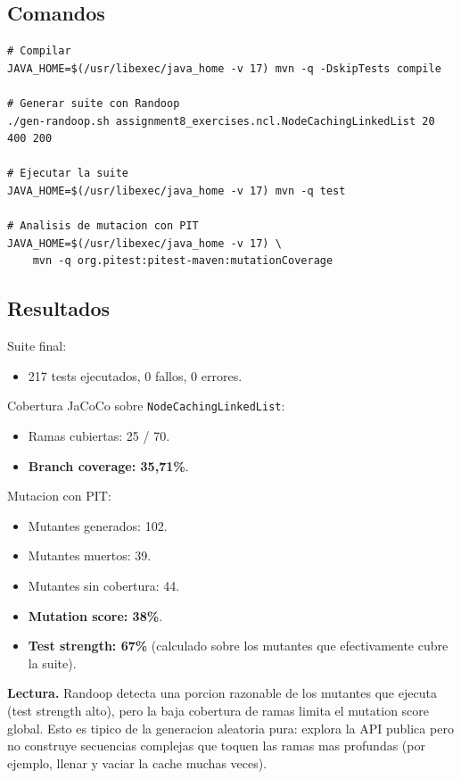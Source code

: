 \documentclass[12pt,a4paper]{article}
\begin{document}
\subsection{Comandos}

\begin{lstlisting}[style=codestyle]
# Compilar
JAVA_HOME=$(/usr/libexec/java_home -v 17) mvn -q -DskipTests compile

# Generar suite con Randoop
./gen-randoop.sh assignment8_exercises.ncl.NodeCachingLinkedList 20 400 200

# Ejecutar la suite
JAVA_HOME=$(/usr/libexec/java_home -v 17) mvn -q test

# Analisis de mutacion con PIT
JAVA_HOME=$(/usr/libexec/java_home -v 17) \
    mvn -q org.pitest:pitest-maven:mutationCoverage
\end{lstlisting}

\subsection{Resultados}

Suite final:

\begin{itemize}
  \item 217 tests ejecutados, 0 fallos, 0 errores.
\end{itemize}

Cobertura JaCoCo sobre \texttt{NodeCachingLinkedList}:

\begin{itemize}
  \item Ramas cubiertas: 25 / 70.
  \item \textbf{Branch coverage: 35{,}71\%}.
\end{itemize}

Mutacion con PIT:

\begin{itemize}
  \item Mutantes generados: 102.
  \item Mutantes muertos: 39.
  \item Mutantes sin cobertura: 44.
  \item \textbf{Mutation score: 38\%}.
  \item \textbf{Test strength: 67\%} (calculado sobre los mutantes que efectivamente cubre la
  suite).
\end{itemize}

\textbf{Lectura.} Randoop detecta una porcion razonable de los mutantes que ejecuta (test
strength alto), pero la baja cobertura de ramas limita el mutation score global. Esto es
tipico de la generacion aleatoria pura: explora la API publica pero no construye secuencias
complejas que toquen las ramas mas profundas (por ejemplo, llenar y vaciar la cache muchas
veces).
\end{document}
